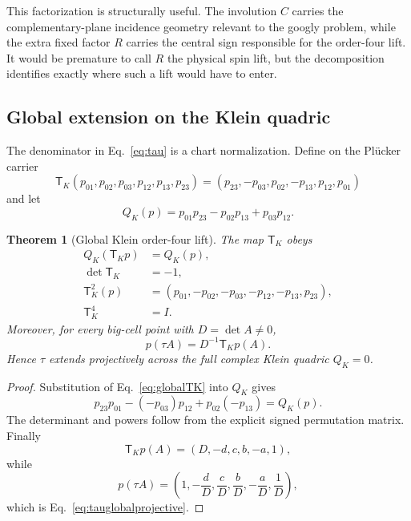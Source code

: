 \documentclass[11pt]{article}
\newtheorem{theorem}{Theorem}[section]
\theoremstyle{definition}\newtheorem{definition}[theorem]{Definition}
\theoremstyle{remark}\newtheorem{remark}[theorem]{Remark}\newtheorem{conjecture}[theorem]{Conjecture}
\begin{document}
This factorization is structurally useful. The involution $C$ carries the complementary-plane incidence geometry relevant to the googly problem, while the extra fixed factor $R$ carries the central sign responsible for the order-four lift. It would be premature to call $R$ the physical spin lift, but the decomposition identifies exactly where such a lift would have to enter.


\subsection{Global extension on the Klein quadric}

The denominator in Eq.~\eqref{eq:tau} is a chart normalization. Define on the Pl\"ucker carrier
\begin{equation}\label{eq:globalTK}
 \mathsf T_K(p_{01},p_{02},p_{03},p_{12},p_{13},p_{23})
 =
 (p_{23},-p_{03},p_{02},-p_{13},p_{12},p_{01})
\end{equation}
and let
\begin{equation}
 Q_K(p)=p_{01}p_{23}-p_{02}p_{13}+p_{03}p_{12}.
\end{equation}

\begin{theorem}[Global Klein order-four lift]\label{thm:globalKlein}
The map $\mathsf T_K$ obeys
\begin{align}
 Q_K(\mathsf T_Kp)&=Q_K(p),\\
 \det\mathsf T_K&=-1,\\
 \mathsf T_K^2(p)&=(p_{01},-p_{02},-p_{03},-p_{12},-p_{13},p_{23}),\\
 \mathsf T_K^4&=I.
\end{align}
Moreover, for every big-cell point with $D=\det A\neq0$,
\begin{equation}\label{eq:tauglobalprojective}
 \boxed{p(\tau A)=D^{-1}\mathsf T_K p(A).}
\end{equation}
Hence $\tau$ extends projectively across the full complex Klein quadric $Q_K=0$.
\end{theorem}

\begin{proof}
Substitution of Eq.~\eqref{eq:globalTK} into $Q_K$ gives
\begin{equation}
 p_{23}p_{01}-(-p_{03})p_{12}+p_{02}(-p_{13})=Q_K(p).
\end{equation}
The determinant and powers follow from the explicit signed permutation matrix. Finally
\begin{equation}
 \mathsf T_Kp(A)=(D,-d,c,b,-a,1),
\end{equation}
while
\begin{equation}
 p(\tau A)=\left(1,-\frac dD,\frac cD,\frac bD,-\frac aD,\frac1D\right),
\end{equation}
which is Eq.~\eqref{eq:tauglobalprojective}.
\end{proof}
\end{document}
